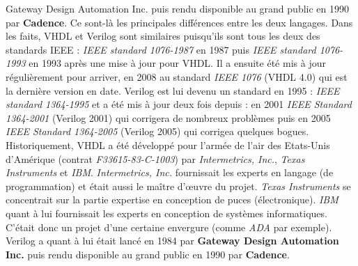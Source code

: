 {Gateway Design Automation Inc.}  puis rendu disponible au grand public en 1990 par \textbf{Cadence}.
Ce sont-là les principales différences entre les deux langages. Dans les faits, VHDL et Verilog sont similaires puisqu'ils sont tous les deux des standards IEEE : \textit{IEEE standard 1076-1987} 
en 1987 puis \textit{IEEE standard 1076-1993}
 en 1993 après une mise à jour pour VHDL. Il a ensuite été mis à jour régulièrement pour arriver, en 2008 au standard \textit{IEEE 1076}
 (VHDL 4.0) qui est la dernière version en date. Verilog est lui devenu un standard en 1995 : \textit{IEEE standard 1364-1995} 
et a été mis à jour deux fois depuis : en 2001  \textit{IEEE Standard 1364-2001} 
(Verilog 2001) qui corrigera de nombreux problèmes puis en 2005  \textit{IEEE Standard 1364-2005}
(Verilog 2005) qui corrigea quelques bogues. Historiquement, VHDL a été développé pour l'armée de l'air des Etats-Unis d'Amérique (contrat \textit{F33615-83-C-1003}) par \textit{Intermetrics, Inc.}, \textit{Texas Instruments} et \textit{IBM}. \textit{Intermetrics, Inc.}  fournissait les experts en langage (de programmation) et était aussi le maître d'\oe{}uvre du projet. \textit{Texas Instruments} se concentrait sur la partie expertise en conception de puces (électronique). \textit{IBM} quant à lui fournissait les experts en conception de systèmes informatiques. C'était donc un projet d'une certaine envergure (comme \textit{ADA} par exemple). Verilog a quant à lui était lancé en 1984 par \textbf{Gateway Design Automation Inc.}  puis rendu disponible au grand public en 1990 par \textbf{Cadence}.

